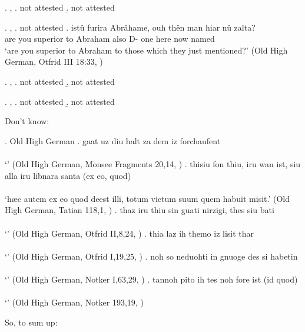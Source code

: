 \ex. , 
\a.  not attested
\b.  not attested

\ex. , 
\a.  not attested
\bg. istû furira Abrâhame, ouh thên man hiar nû zalta?\\
 {are you} superior\scsub{[dat]} {to Abraham} also D- one here now named\scsub{[acc]}\\
 `are you superior to Abraham to those which they just mentioned?' \hfill (Old High German, Otfrid III 18:33, \citealt[761]{behaghel1923})

\ex. , 
\a.  not attested
\b.  not attested

\ex. , 
\a.  not attested
\b.  not attested





Don't know:

\ex. Old High German
\ag. gaat uz diu halt za dem iz forchaufent\\
 \\
 `' \hfill (Old High German, Monsee Fragments 20,14, \citealt[761]{behaghel1923})
\bg. thisiu fon thiu, iru wan ist, siu alla iru libnara santa (ex eo, quod)\\
 \\
 `hæc autem ex eo quod deest illi, totum victum suum quem habuit misit.' \hfill (Old High German, Tatian 118,1, \citealt[761]{behaghel1923})
\bg. thaz iru thiu sin guati nirzigi, thes siu bati\\
 \\
 `' \hfill (Old High German, Otfrid II,8,24, \citealt[761]{behaghel1923})
\bg. thia laz ih themo iz lisit thar\\
 \\
 `' \hfill (Old High German, Otfrid I,19,25, \citealt[761]{behaghel1923})
\bg. noh so neduohti in gnuoge des si habetin\\
 \\
 `' \hfill (Old High German, Notker I,63,29, \citealt[761]{behaghel1923})
\bg. tannoh pito ih tes noh fore ist (id quod)\\
 \\
 `' \hfill (Old High German, Notker 193,19, \citealt[761]{behaghel1923})

So, to sum up:


